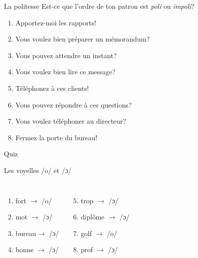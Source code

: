 \documentclass{beamer}
\begin{document}
  \begin{frame}{La politesse}
    Est-ce que l'ordre de ton patron  est \emph{ poli } ou \emph{impoli}?
    \begin{center}
      \begin{enumerate}
        \item Apportez-moi les rapports! \underline{}
        \item Vous voulez bien préparer un mémorandum? \underline{}
        \item Vous pouvez attendre un instant? \underline{}
        \item Vous voulez bien lire ce message? \underline{}
        \item Téléphonez à ces clients! \underline{}
        \item Vous pouvez répondre à ces questions? \underline{}
        \item Vous voulez téléphoner au directeur? \underline{}
        \item Fermez la porte du bureau! \underline{}
      \end{enumerate}
    \end{center}
  \end{frame}

  \begin{frame}{}
    \begin{center}
      \Large Quiz
    \end{center}
  \end{frame}

  \begin{frame}{Les voyelles /o/ et /ɔ/}
    \begin{columns}
        \begin{enumerate}
          \item fort $\to$ /o/ 
          \item mot $\to$  /ɔ/
          \item bureau$\to$  /ɔ/
          \item bonne $\to$  /ɔ/
        \end{enumerate}
        \begin{enumerate}
          \setcounter{enumi}{4}
          \item trop $\to$  /ɔ/
          \item diplôme $\to$  /ɔ/
          \item golf $\to$ /o/ 
          \item prof $\to$  /ɔ/
        \end{enumerate}
    \end{columns}
  \end{frame}
\end{document}
